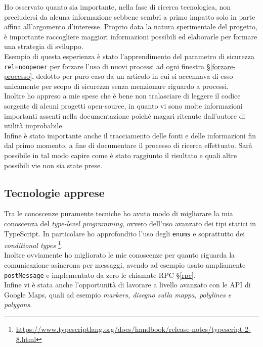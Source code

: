 Ho osservato quanto sia importante, nella fase di ricerca tecnologica, non precludersi da alcuna informazione sebbene sembri a primo impatto solo in parte affina all'argomento d'interesse. Proprio data la natura sperimentale del progetto, è importante raccogliere maggiori informazioni possibili ed elaborarle per formare una strategia di sviluppo. \\

Esempio di questa esperienza è stato l'apprendimento del parametro di sicurezza \texttt{rel=noopener} per forzare l'uso di nuovi processi ad ogni finestra §\ref{forzare-processo}, dedotto per puro caso da un articolo in cui si accennava di esso unicamente per scopo di sicurezza senza menzionare riguardo a processi. \\

Inoltre ho appreso a mie spese che è bene non tralasciare di leggere il codice sorgente di alcuni progetti open-source, in quanto vi sono molte informazioni importanti assenti nella documentazione poiché magari ritenute dall'autore di utilità improbabile. \\

Infine è stato importante anche il tracciamento delle fonti e delle informazioni fin dal primo momento, a fine di documentare il processo di ricerca effettuato. Sarà possibile in tal modo capire come è stato raggiunto il risultato e quali altre possibili vie non sia state prese.

\subsection{Tecnologie apprese}

Tra le conoscenze puramente tecniche ho avuto modo di migliorare la mia conoscenza del \textit{type-level programming}, ovvero dell'uso avanzato dei tipi statici in TypeScript. In particolare ho approfondito l'uso degli \texttt{enums} e soprattutto dei \textit{conditional types} \footnote{\url{https://www.typescriptlang.org/docs/handbook/release-notes/typescript-2-8.html}}. \\

Inoltre ovviamente ho migliorato le mie conoscenze per quanto riguarda la comunicazione asincrona per messaggi, avendo ad esempio usato ampliamente \texttt{postMessage} e implementato da zero le chiamate RPC §\ref{rpc}. \\

Infine vi è stata anche l'opportunità di lavorare a livello avanzato con le API di Google Maps, quali ad esempio \textit{markers, disegno sulla mappa, polylines e polygons}.

